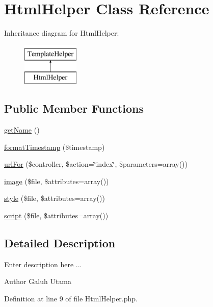 \hypertarget{class_html_helper}{\section{\-Html\-Helper \-Class \-Reference}
\label{class_html_helper}
}
\-Inheritance diagram for \-Html\-Helper\-:\begin{figure}[H]
\begin{center}
\leavevmode
\includegraphics[height=2.000000cm]{class_html_helper}
\end{center}
\end{figure}
\subsection*{\-Public \-Member \-Functions}
\begin{DoxyCompactItemize}
\item 
\hyperlink{class_html_helper_a3d0963e68bb313b163a73f2803c64600}{get\-Name} ()
\item 
\hyperlink{class_html_helper_ada6512b5f3e36c6d1900a049e799b67b}{format\-Timestamp} (\$timestamp)
\item 
\hyperlink{class_html_helper_a13c0e5036519fa6bde75a0e15867c1e6}{url\-For} (\$controller, \$action=\char`\"{}index\char`\"{}, \$parameters=array())
\item 
\hyperlink{class_html_helper_aa69bcfd4b6a5150f903cdccaf0608ff4}{image} (\$file, \$attributes=array())
\item 
\hyperlink{class_html_helper_a2cbf12a406936062c1c9e10c17ec413e}{style} (\$file, \$attributes=array())
\item 
\hyperlink{class_html_helper_a2ad936f3eedd8e9b9fdcf9e79dbfe455}{script} (\$file, \$attributes=array())
\end{DoxyCompactItemize}


\subsection{\-Detailed \-Description}
\-Enter description here ... \begin{DoxyAuthor}{\-Author}
\-Galuh \-Utama 
\end{DoxyAuthor}


\-Definition at line 9 of file \-Html\-Helper.\-php.



